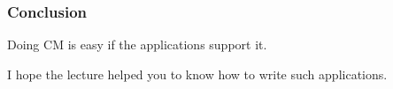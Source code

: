 \begin{frame}
	\frametitle{Conclusion}

	Doing CM is easy if the applications support it.
	\vspace{1cm}

	I hope the lecture helped you to know how to write such applications.
\end{frame}




\nocite{raab2017introducing}

\appendix

\begin{frame}[allowframebreaks]
	
	
\end{frame}



